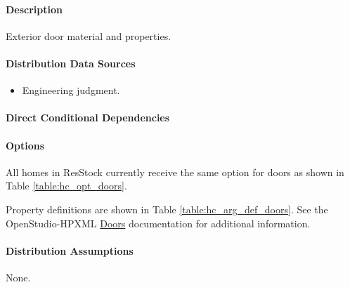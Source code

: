 \paragraph{Description}
% 
Exterior door material and properties.

\paragraph{Distribution Data Sources}
% 
\begin{itemize}

\item
  Engineering judgment.
\end{itemize}

\paragraph{Direct Conditional Dependencies}


\paragraph{Options}
All homes in ResStock currently receive the same option for doors as shown in Table \ref{table:hc_opt_doors}.



Property definitions are shown in Table \ref{table:hc_arg_def_doors}. See the OpenStudio-HPXML \href{https://openstudio-hpxml.readthedocs.io/en/v1.10.0/workflow_inputs.html#hpxml-doors}{Doors} documentation for additional information.



\paragraph{Distribution Assumptions}
% 
None.
